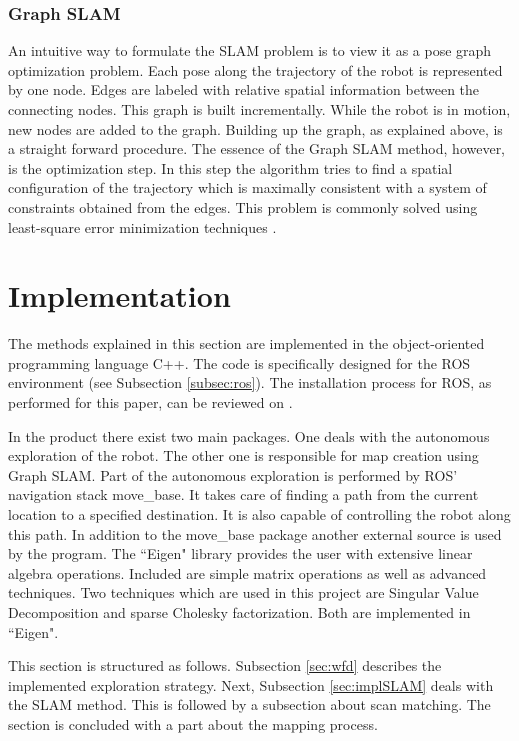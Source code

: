 \documentclass{ba-kecs}
\begin{document}
\subsubsection{Graph SLAM}
An intuitive way to formulate the SLAM problem is to view it as a pose graph optimization problem. Each pose along the trajectory of the robot is represented by one node. Edges are labeled with relative spatial information between the connecting nodes. This graph is built incrementally. While the robot is in motion, new nodes are added to the graph. Building up the graph, as explained above, is a straight forward procedure. The essence of the Graph SLAM method, however, is the optimization step. In this step the algorithm tries to find a spatial configuration of the trajectory which is maximally consistent with a system of constraints obtained from the edges. This problem is commonly solved using least-square error minimization techniques \citep{Grisetti}.

\section{Implementation}
\label{sec:impl}

The methods explained in this section are implemented in the object-oriented programming language C++. The code is specifically designed for the ROS environment (see Subsection \ref{subsec:ros}). The installation process for ROS, as performed for this paper, can be reviewed on \cite{swarmlab}.

In the product there exist two main packages. One deals with the autonomous exploration of the robot. The other one is responsible for map creation using Graph SLAM. Part of the autonomous exploration is performed by ROS' navigation stack move\_base. It takes care of finding a path from the current location to a specified destination. It is also capable of controlling the robot along this path. In addition to the move\_base package another external source is used by the program. The ``Eigen" library \citep{eigen} provides the user with extensive linear algebra operations. Included are simple matrix operations as well as advanced techniques. Two techniques which are used in this project are Singular Value Decomposition and sparse Cholesky factorization. Both are implemented in ``Eigen".

This section is structured as follows. Subsection \ref{sec:wfd} describes the implemented exploration strategy. Next, Subsection \ref{sec:implSLAM} deals with the SLAM method. This is followed by a subsection about scan matching. The section is concluded with a part about the mapping process. 
\end{document}
